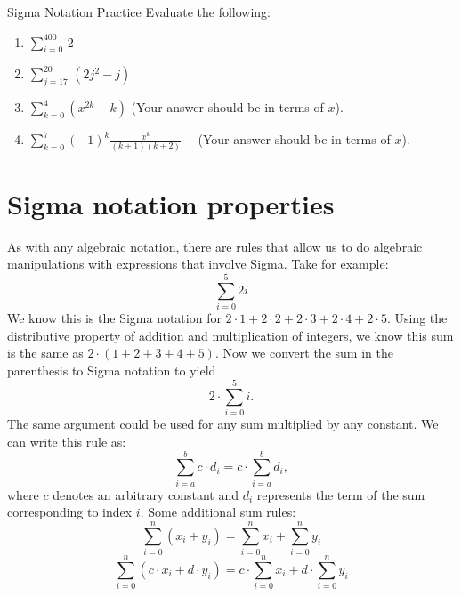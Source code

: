 \begin{exercise}{Sigma Notation Practice}
Evaluate the following:
\begin {enumerate}[(1)]
\item
$\sum _{i=0}^{400} \,2$
\item
$\sum_{j=17}^{20} \, \left(2j^2 - j \right)$
\item
$\sum_{k=0}^{4}(x^{2k} - k) $ (Your answer should be in terms of $x$).
\item
$\sum_{k=0}^{7} (-1)^k\frac{x^{k}}{(k+1)(k+2)}$ ~~(Your answer should be in terms of $x$).
\end {enumerate}
\end{exercise}

\section{Sigma notation properties}

As with any algebraic notation, there are rules that allow us to do algebraic manipulations with expressions that involve Sigma. 
Take for example:
\[\sum_{i=0}^{5}2i\]
We know this is the Sigma notation for $2\cdot1+2\cdot2+2\cdot3+2\cdot4+2\cdot5$. Using the distributive property of addition and multiplication of integers, we know this sum is the same as $2\cdot(1+2+3+4+5)$.  Now we convert the sum in the parenthesis to Sigma notation to yield
\[2\cdot\sum_{i=0}^{5}i.\]
The same argument could be used for any sum  multiplied by any constant. We can write this rule as:
\[\sum_{i=a}^{b} c \cdot d_i = c \cdot \sum_{i=a}^{b}  d_i,\]
where $c$ denotes an arbitrary constant and $d_i$ represents the term of the sum corresponding to index $i$.
Some additional sum rules:
\[ \sum_{i=0}^n \left(x_i +y_i \right) = \sum_{i=0}^n x_i + \sum_{i=0}^n y_i \]
\[ \sum_{i=0}^n \left(c \cdot x_i + d \cdot y_i \right) = c \cdot \sum_{i=0}^n x_i + d \cdot \sum_{i=0}^n y_i \]

